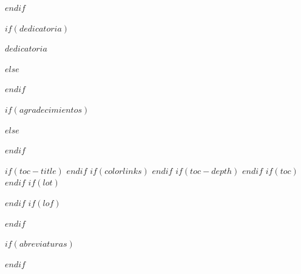 $endif$
\newpage


$if(dedicatoria)$

\thispagestyle{empty}

\vspace*{0.3\textheight}
\begin{center}
{$dedicatoria$}
\end{center}
$else$


$endif$
\newpage


$if(agradecimientos)$
\thispagestyle{empty}



$else$


$endif$
\newpage


\begingroup
\thispagestyle{empty}
$if(toc-title)$
\renewcommand*\contentsname{$toc-title$}
$endif$
$if(colorlinks)$
\hypersetup{linkcolor=$if(toccolor)$$toccolor$$else$$endif$}
$endif$
$if(toc-depth)$
\setcounter{tocdepth}{$toc-depth$}
$endif$
$if(toc)$
\tableofcontents
$endif$
$if(lot)$
\listoftables
$endif$
$if(lof)$
\listoffigures
$endif$
\endgroup


$if(abreviaturas)$
\thispagestyle{empty}


\noindent

$endif$
